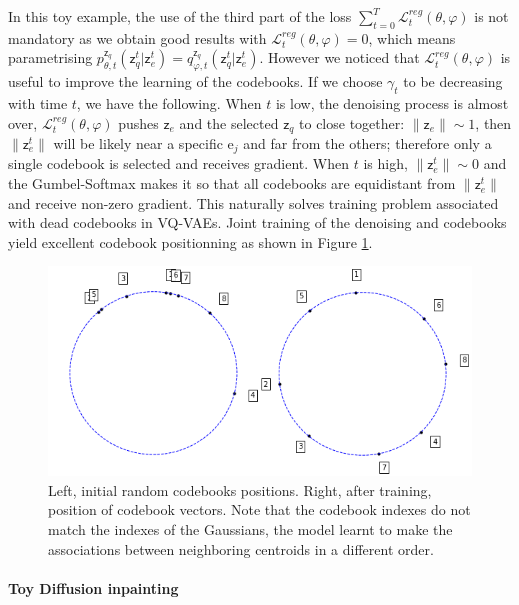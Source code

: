 \documentclass[nohyperref]{article}
\theoremstyle{plain}
\theoremstyle{definition}
\theoremstyle{remark}
\newcommand{\latentcont}{\mathsf{z}_e}
\newcommand{\latentdis}{\mathsf{z}_q}
\newcommand{\rme}{\mathrm{e}}
\newcommand{\embed}{\rme}
\begin{document}
In this toy example, the use of the third part of the loss $\sum_{t=0}^T \mathcal{L}^{reg}_t(\theta,\varphi)$ is not mandatory as we obtain good results with $\mathcal{L}^{reg}_t(\theta,\varphi) = 0$, which means parametrising $p_{\theta,t}^{\latentdis}(\latentdis^t|\latentcont^t) = q_{\varphi,t}^{\latentdis}(\latentdis^t|\latentcont^t)$. However we noticed that $\mathcal{L}^{reg}_t(\theta,\varphi)$ is useful to improve the learning of the codebooks. If we choose $\gamma_t$ to be decreasing with time $t$, we have the following. When $t$ is low, the denoising process is almost over, $\mathcal{L}^{reg}_t(\theta,\varphi)$ pushes $\latentcont$ and the selected $\latentdis$ to close together: $\|\latentcont\| \sim 1$, then $\|\latentcont^t\|$ will be likely near a specific $\embed_j$ and far from the others; therefore only a single codebook is selected and receives gradient. When $t$ is high, $\|\latentcont^t\| \sim 0$ and the Gumbel-Softmax makes it so that all codebooks are equidistant from $\|\latentcont^t\|$ and receive non-zero gradient. This naturally solves training problem associated with dead codebooks in VQ-VAEs. Joint training of the denoising and codebooks yield excellent codebook positionning as shown in Figure \ref{ap:codebooks}.

\begin{figure}[h!]
    \centering
    \includegraphics[scale=0.4]{images/codebookstraining.png}
    \caption{Left, initial random codebooks positions. Right, after training, position of codebook vectors. Note that the codebook indexes do not match the indexes of the Gaussians, the model learnt to make the associations between neighboring centroids in a different order.}
    \label{ap:codebooks}
\end{figure}

\paragraph{Toy Diffusion inpainting}
\end{document}
